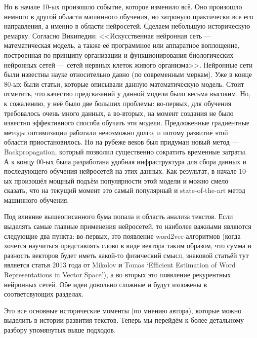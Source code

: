 \documentclass[a4paper,14pt]{extarticle}
\begin{document}
Но в начале 10-ых произошло событие, которое изменило всё. Оно произошло немного в другой области машинного обучения, но затронуло практически все его направления, а именно в области нейросетей. Сделаем небольшую историческую ремарку. Согласно Википедии: <<Искусственная нейронная сеть  --- математическая модель, а также её программное или аппаратное воплощение, построенная по принципу организации и функционирования биологических нейронных сетей --- сетей нервных клеток живого организма>>.  Нейронные сети были известны науке относительно давно (по современным меркам). Уже в конце 80-ых были статьи, которые описывали данную математическую модель. Стоит отметить, что качество предсказаний у данной модели было весьма высоким. Но, к сожалению, у неё было две больших проблемы: во-первых, для обучения требовалось очень много данных, а во-вторых, на момент создания не было известно эффективного способа обучать эти модели. Предложенные градиентные методы оптимизации работали невозможно долго, и потому развитие этой области приостановилось. Но на рубеже веков был придуман новый метод --- Backpropagation, который позволил существенно сократить временные затраты. А к концу 00-ых была разработана удобная инфраструктура для сбора данных и последующего обучения нейросетей на этих данных. Как результат, в начале 10-ых произошёл мощный подъём популярности этой модели и можно смело сказать, что на текущий момент это самый популярный и state-of-the-art метод машинного обучения.

Под влияние вышеописанного бума попала и область анализа текстов. Если выделять самые главные применения нейросетей, то наиболее важными являются следующие два пункта: во-первых, это появление word2vec-алгоритмов (когда хочется научиться представлять слово в виде вектора таким образом, что сумма и разность векторов будет иметь какой-то физический смысл, знаковой статьёй тут является статья 2013 года от Mikolov и Tomas `Efficient Estimation of Word Representations in Vector Space'), а во вторых это появление рекурентных нейронных сетей. Обе идеи довольно сложные и будут изложены в соответсвующих разделах.

Это все основные исторические моменты (по мнению автора), которые можно выделить в истории развития текстов. Теперь мы перейдём к более детальному разбору упомянутых выше подходов. 
\end{document}
